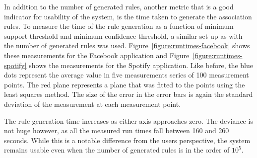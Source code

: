 In addition to the number of generated rules, another metric that is a good indicator for usability of the system, is the time taken to generate the association rules. To measure the time of the rule generation as a function of minimum support threshold and minimum confidence threshold, a similar set up as with the number of generated rules was used. Figure~\ref{figure:runtimes-facebook} shows these measurements for the Facebook application and Figure~\ref{figure:runtimes-spotify} shows the measurements for the Spotify application. Like before, the blue dots represent the average value in five measurements series of 100 measurement points. The red plane represents a plane that was fitted to the points using the least squares method. The size of the error in the error bars is again the standard deviation of the measurement at each measurement point.

The rule generation time increases as either axis approaches zero. The deviance is not huge however, as all the measured run times fall between 160 and 260 seconds. While this is a notable difference from the users perspective, the system remains usable even when the number of generated rules is in the order of $10^5$.   


